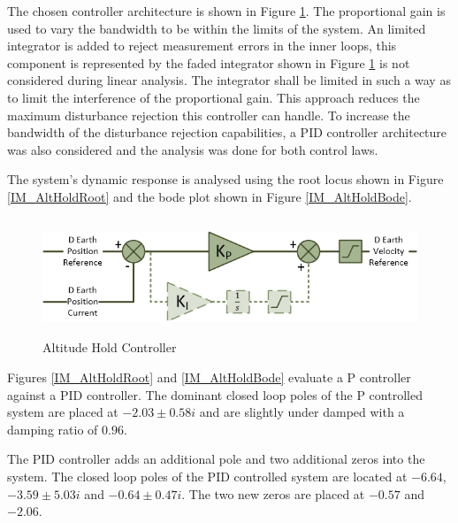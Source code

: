\documentclass[12pt]{report}
\begin{document}
The chosen controller architecture is shown in Figure \ref{IM_AltHoldController}. The proportional gain is used to vary the bandwidth to be within the limits of the system. An limited integrator is added to reject measurement errors in the inner loops, this component is represented by the faded integrator shown in Figure \ref{IM_AltHoldController} is not considered during linear analysis. The integrator shall be limited in such a way as to limit the interference of the proportional gain. This approach reduces the maximum disturbance rejection this controller can handle. To increase the bandwidth of the disturbance rejection capabilities, a PID controller architecture was also considered and the analysis was done for both control laws. 

The system's dynamic response is analysed using the root locus shown in Figure \ref{IM_AltHoldRoot} and the bode plot shown in Figure \ref{IM_AltHoldBode}.

\begin{figure}[H]
	\centering
	\includegraphics[height = 3.5cm]{../References/Diagrams/AltHoldController.jpg}
	\caption{Altitude Hold Controller}
	\label{IM_AltHoldController}
\end{figure}

Figures \ref{IM_AltHoldRoot} and \ref{IM_AltHoldBode} evaluate a P controller against a PID controller. The dominant closed loop poles of the P controlled system are placed at $-2.03 \pm 0.58i$ and are slightly under damped with a damping ratio of $0.96$. 

The PID controller adds an additional pole and two additional zeros into the system. The closed loop poles of the PID controlled system are located at $-6.64$, $-3.59 \pm 5.03i$ and $-0.64 \pm 0.47i$. The two new zeros are placed at $-0.57$ and $-2.06$.
\end{document}
